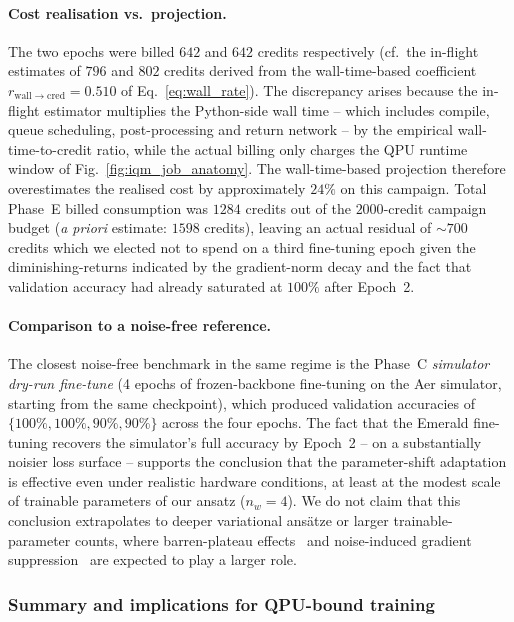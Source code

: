 \paragraph{Cost realisation vs.\ projection.}
The two epochs were billed $642$ and $642$ credits respectively (cf.\ the in-flight estimates of $796$ and $802$ credits derived from the wall-time-based coefficient $r_{\mathrm{wall}\to\mathrm{cred}}=0.510$ of Eq.~\ref{eq:wall_rate}). The discrepancy arises because the in-flight estimator multiplies the Python-side wall time -- which includes compile, queue scheduling, post-processing and return network -- by the empirical wall-time-to-credit ratio, while the actual billing only charges the QPU runtime window of Fig.~\ref{fig:iqm_job_anatomy}. The wall-time-based projection therefore overestimates the realised cost by approximately $24\%$ on this campaign. Total Phase~E billed consumption was $1284$ credits out of the $2000$-credit campaign budget (\emph{a priori} estimate: $1598$ credits), leaving an actual residual of $\sim 700$ credits which we elected not to spend on a third fine-tuning epoch given the diminishing-returns indicated by the gradient-norm decay and the fact that validation accuracy had already saturated at $100\%$ after Epoch~2.

\paragraph{Comparison to a noise-free reference.}
The closest noise-free benchmark in the same regime is the Phase~C \emph{simulator dry-run fine-tune} (4 epochs of frozen-backbone fine-tuning on the Aer simulator, starting from the same checkpoint), which produced validation accuracies of $\{100\%, 100\%, 90\%, 90\%\}$ across the four epochs. The fact that the Emerald fine-tuning recovers the simulator's full accuracy by Epoch~2 -- on a substantially noisier loss surface -- supports the conclusion that the parameter-shift adaptation is effective even under realistic hardware conditions, at least at the modest scale of trainable parameters of our ansatz ($n_w=4$). We do not claim that this conclusion extrapolates to deeper variational ansätze or larger trainable-parameter counts, where barren-plateau effects~\cite{McClean2018,Holmes2022PRXQ} and noise-induced gradient suppression~\cite{Wang2021NoiseInducedBP} are expected to play a larger role.

\subsubsection{Summary and implications for QPU-bound training}
\label{subsec:hw_summary}

